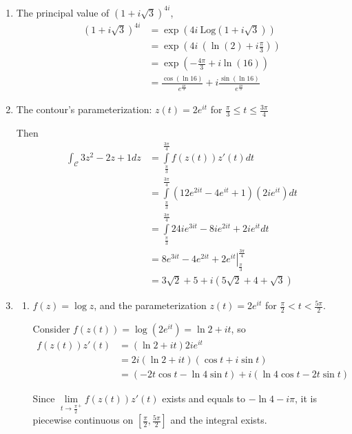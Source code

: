 \documentclass[12pt]{article}
\newcommand{\curve}{\mathcal{C}}
\newcommand{\integral}{\int\limits}
\begin{document}
\begin{enumerate}
    \item The principal value of $(1+i\sqrt3)^{4i}$, 
        \begin{align*}
            (1+i\sqrt3)^{4i} &= \exp(4i ~\text{Log}(1+i\sqrt3)) \\
            &= \exp\left(4i ~ \left(\ln(2) + i\frac{\pi}{3}\right)\right) \\
            &= \exp\left(-\frac{4\pi}{3} + i\ln(16)\right)\\
            &= \frac{\cos(\ln16)}{e^{\frac{4\pi}{3}}} + i\frac{\sin(\ln16)}{e^{\frac{4\pi}{3}}}
        \end{align*}
    \pagebreak
    \item The contour's parameterization: $z(t) =  2e^{it}$ for $\frac{\pi}{3} \le t \le \frac{3\pi}{4}$
    
    Then 
    \begin{align*}
        \int_\curve 3z^2 - 2z + 1 dz &= \integral^\frac{3\pi}{4}_\frac{\pi}{3} f(z(t))z'(t)dt\\
        &= \integral^\frac{3\pi}{4}_\frac{\pi}{3} (12e^{2it} - 4e^{it} + 1)(2ie^{it}) dt \\
        &= \integral^\frac{3\pi}{4}_\frac{\pi}{3} 24ie^{3it} - 8ie^{2it} + 2ie^{it} dt\\
        &\left. = 8e^{3it} -4e^{2it} +2e^{it} \right\vert_{\frac{\pi}{3}}^{\frac{3\pi}{4}}\\
        &= 3\sqrt2 + 5+ i (5\sqrt2 + 4 + \sqrt3)
    \end{align*}

    \item 
    \begin{enumerate}
        \item $f(z) = \log z$, and the parameterization $z(t) = 2e^{it}$ for $\frac{\pi}{2} < t < \frac{5\pi}{2}$. 

        Consider $f(z(t)) = \log(2e^{it}) = \ln2 + it$, so 
        \begin{align*}
        f(z(t)) z'(t) &= (\ln2 +it)2ie^{it}\\ 
        &= 2i(\ln2 + it)(\cos t + i\sin t)\\
        &= (-2t\cos t - \ln4 \sin t )+ i(\ln4 \cos t - 2t\sin t)
        \end{align*}

        Since  $\lim\limits_{t \to \frac{\pi}{2}^{+}} f(z(t))z'(t)$ exists and equals to $-\ln4 - i\pi$, 
        it is piecewise continuous on $[\frac{\pi}{2}, \frac{5\pi}{2}]$ and the integral exists. 


\end{enumerate}
\end{enumerate}
\end{document}
